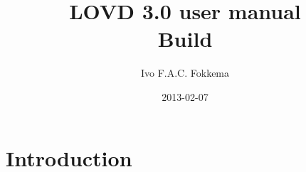 \documentclass[a4paper,oneside,openany,12pt]{memoir}
\title{LOVD 3.0 user manual \\\vskip 1cm Build \LOVDversion}
\author{Ivo F.A.C. Fokkema}
\institute{Leiden University Medical Center}
\date{2013-02-07} %
\begin{document}
\begin{titlingpage} %
\maketitle
\end{titlingpage}





\hypertarget{toc}{}
\tableofcontents










\chapter{Introduction}
\end{document}
